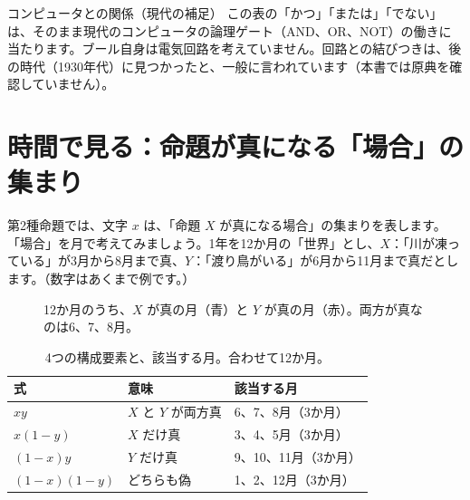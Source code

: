 \documentclass[a4paper,11pt,openany]{ltjsbook}
\begin{document}
\begin{notebox}{コンピュータとの関係（現代の補足）}
この表の「かつ」「または」「でない」は、そのまま現代のコンピュータの論理ゲート（AND、OR、NOT）の働きに当たります。ブール自身は電気回路を考えていません。回路との結びつきは、後の時代（1930年代）に見つかったと、一般に言われています（本書では原典を確認していません）。
\end{notebox}

\section{時間で見る：命題が真になる「場合」の集まり}

第2種命題では、文字 $x$ は、「命題 $X$ が真になる場合」の集まりを表します。「場合」を月で考えてみましょう。1年を12か月の「世界」とし、$X$：「川が凍っている」が3月から8月まで真、$Y$：「渡り鳥がいる」が6月から11月まで真だとします。（数字はあくまで例です。）

\begin{figure}[htbp]
\centering
{}
\caption{12か月のうち、$X$ が真の月（青）と $Y$ が真の月（赤）。両方が真なのは6、7、8月。}
\end{figure}

\begin{table}[htbp]
\centering
\begin{tabular}{lll}
\toprule
式 & 意味 & 該当する月\\
\midrule
$xy$ & $X$ と $Y$ が両方真 & 6、7、8月（3か月）\\
$x(1-y)$ & $X$ だけ真 & 3、4、5月（3か月）\\
$(1-x)y$ & $Y$ だけ真 & 9、10、11月（3か月）\\
$(1-x)(1-y)$ & どちらも偽 & 1、2、12月（3か月）\\
\bottomrule
\end{tabular}
\caption{4つの構成要素と、該当する月。合わせて12か月。}
\end{table}
\end{document}
